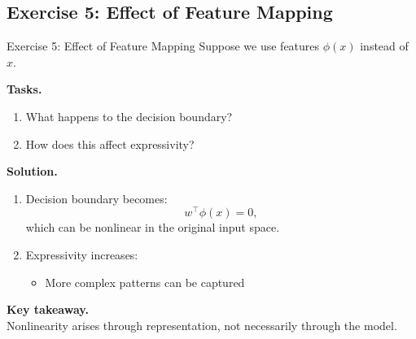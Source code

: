 \documentclass[aspectratio=169,11pt]{beamer}
\begin{document}
\subsection{Exercise 5: Effect of Feature Mapping}
\begin{frame}[t,allowframebreaks]{Exercise 5: Effect of Feature Mapping}
\small
Suppose we use features $\phi(x)$ instead of $x$.

\textbf{Tasks.}\\ \begin{enumerate}
    \item What happens to the decision boundary?
    \item How does this affect expressivity?
\end{enumerate}

\textbf{Solution.}\\ \begin{enumerate}
\item Decision boundary becomes:
\[
w^\top \phi(x) = 0,
\]
which can be nonlinear in the original input space.

\item Expressivity increases:
\begin{itemize}
    \item More complex patterns can be captured
\end{itemize}
\end{enumerate}

\textbf{Key takeaway.}\\ Nonlinearity arises through representation, not necessarily through the model.
\end{frame}
\end{document}
